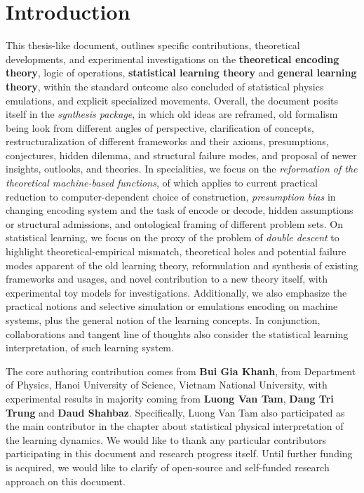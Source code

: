 \chapter{Introduction}

This thesis-like document, outlines specific contributions, theoretical developments, and experimental investigations on the \textbf{theoretical encoding theory}, logic of operations, \textbf{statistical learning theory} and \textbf{general learning theory}, within the standard outcome also concluded of statistical physics emulations, and explicit specialized movements. Overall, the document posits itself in the \textit{synthesis package}, in which old ideas are reframed, old formalism being look from different angles of perspective, clarification of concepts, restructuralization of different frameworks and their axioms, presumptions, conjectures, hidden dilemma, and structural failure modes, and proposal of newer insights, outlooks, and theories. In specialities, we focus on the \textit{reformation of the theoretical machine-based functions}, of which applies to current practical reduction to computer-dependent choice of construction, \textit{presumption bias} in changing encoding system and the task of encode or decode, hidden assumptions or structural admissions, and ontological framing of different problem sets. On statistical learning, we focus on the proxy of the problem of \textit{double descent} to highlight theoretical-empirical mismatch, theoretical holes and potential failure modes apparent of the old learning theory, reformulation and synthesis of existing frameworks and usages, and novel contribution to a new theory itself, with experimental toy models for investigations. Additionally, we also emphasize the practical notions and selective simulation or emulations encoding on machine systems, plus the general notion of the learning concepts. In conjunction, collaborations and tangent line of thoughts also consider the statistical learning interpretation, of such learning system. 

The core authoring contribution comes from \textbf{Bui Gia Khanh}, from Department of Physics, Hanoi University of Science, Vietnam National University, with experimental results in majority coming from \textbf{Luong Van Tam}, \textbf{Dang Tri Trung} and \textbf{Daud Shahbaz}. Specifically, Luong Van Tam also participated as the main contributor in the chapter about statistical physical interpretation of the learning dynamics. We would like to thank any particular contributors participating in this document and research progress itself. Until further funding is acquired, we would like to clarify of open-source and self-funded research approach on this document. 

